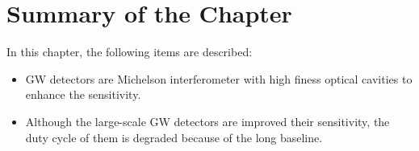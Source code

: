 \section{Summary of the Chapter}
In this chapter, the following items are described:
\begin{itemize}
\item GW detectors are Michelson interferometer with high finess optical cavities to enhance the sensitivity.
\item Although the large-scale GW detectors are improved their sensitivity, the duty cycle of them is degraded because of the long baseline.
\end{itemize}




